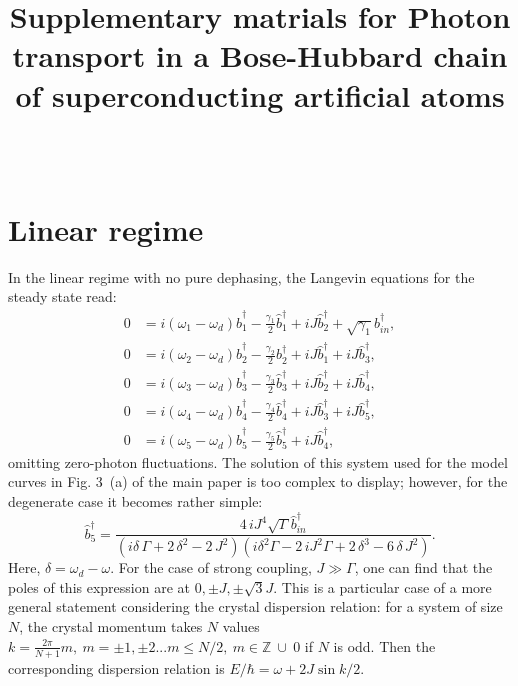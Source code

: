 \documentclass[%
 aps, pra,
 amsmath,amssymb,
 preprint,%
superscriptaddress
]{revtex4-2}
\newcommand{\mytitile}{Supplementary matrials for Photon transport in a Bose-Hubbard chain of superconducting artificial atoms}
\begin{document}
	
	\title[\mytitile]{\mytitile\\~}
	
\maketitle


\section{Linear regime} \label{sec:app_linear}

In the linear regime with no pure dephasing, the Langevin equations for the steady state read:
\begin{equation}
\begin{aligned}
0 &= i(\omega_1 - \omega_d)\hat b_1^\dag - \frac{\gamma_1}{2} \hat b_1^\dag + i J\hat b_2^\dag + \sqrt{\gamma_1}b_{in}^\dag,\\
0 &= i(\omega_2 - \omega_d)\hat b_2^\dag - \frac{\gamma_2}{2} b_{2}^\dag + i J\hat b_{1}^\dag + i J\hat b_{3}^\dag,\\
0 &= i(\omega_3 - \omega_d)\hat b_3^\dag - \frac{\gamma_3}{2} \hat b_{3}^\dag + i J\hat b_{2}^\dag + i J\hat b_{4}^\dag,\\
0 &= i(\omega_4 - \omega_d)\hat b_4^\dag -\frac{\gamma_4}{2} \hat b_{4}^\dag + i J\hat b_{3}^\dag + i J\hat b_{5}^\dag,\\
0 &= i(\omega_5 - \omega_d)\hat b_5^\dag - \frac{\gamma_5}{2} \hat b_5^\dag + i J\hat b_4^\dag,
\end{aligned} 
\end{equation}
omitting zero-photon fluctuations. The solution of this system used for the model curves in Fig. 3~(a) of the main paper is too complex to display; however, for the degenerate case it becomes rather simple:
\begin{equation}
\hat b_{{5}}^\dag={\frac {4\,i{J}^{4}\sqrt {\Gamma} \hat b_{in}^\dag}{ \left( i\delta\,
\Gamma+2\,{\delta}^{2}-2\,{J}^{2} \right)  \left( i{\delta}^{2}
\Gamma-2\,i{J}^{2}\Gamma+2\,{\delta}^{3}-6\,\delta\,{J}^{2
} \right) }}.\label{eq:s21}
\end{equation}
Here, $\delta = \omega_d - \omega$. For the case of strong coupling, $J\gg \Gamma$, one can find that the poles of this expression are at $0, \pm J, \pm \sqrt 3 J $. This is a particular case of a more general statement considering the crystal dispersion relation: for a system of size $N$, the crystal momentum takes $N$ values $k = \frac{2 \pi}{N+1} m,\ m=\pm 1, \pm 2... m \leq N/2,\ m\in \mathbb{Z}\  \cup\ {0}$ if $ N $ is odd. Then the corresponding dispersion relation is $E/\hbar = \omega + 2 J \sin k/2$.
\end{document}
